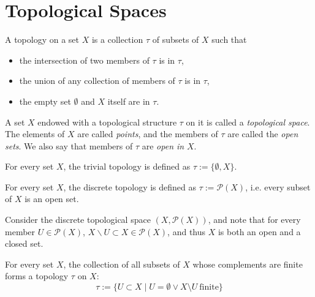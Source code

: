 \section{Topological Spaces}
\begin{defn}\label{defn:topological_space}
	A topology on a set $X$ is a collection $\tau$ of subsets of $X$ such that 
	\begin{itemize}
		\item the intersection of two members of $\tau$ is in $\tau$, 
		\item the union of any collection of members of $\tau$ is in $\tau$, 
		\item the empty set $\emptyset$ and $X$ itself are in $\tau$.
	\end{itemize}
	A set $X$ endowed with a topological structure $\tau$ on it is called a \textit{topological space}. The elements of $X$ are called \textit{points}, and the members of $\tau$ are called the \textit{open sets}. We also say that members of $\tau$ are \textit{open in} $X$.
\end{defn} 

\begin{exmp}
	For every set $X$, the trivial topology is defined as $\tau := \{\emptyset, X\}$.
\end{exmp}

\begin{exmp}\label{exmp:discrete_topology}
	For every set $X$, the discrete topology is defined as $\tau := \mathcal P(X)$, i.e. every subset of $X$ is an open set.
\end{exmp}

\begin{remark}
	Consider the discrete topological space $(X, \mathscr P(X))$, and note that for every member $U\in \mathscr P(X)$, $X\backslash U\subset X\in \mathscr P(X)$, and thus $X$ is both an open and a closed set. 
\end{remark}

\begin{exmp}
	For every set $X$, the collection of all subsets of $X$ whose complements are finite forms a topology $\tau$ on $X$:
	$$\tau := \{ U\subset X\mid U = \emptyset \lor X\setminus U \ \text{finite} \}$$
\end{exmp}

